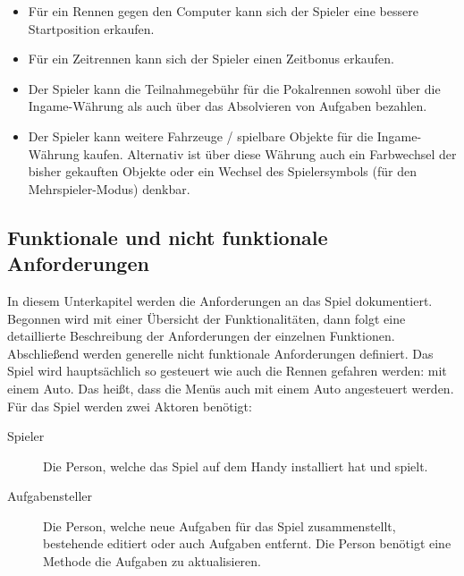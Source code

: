 \begin{enumerate}
		\begin{itemize}
			\item{Für ein Rennen gegen den Computer kann sich der Spieler eine bessere Startposition erkaufen.}
			\item{Für ein Zeitrennen kann sich der Spieler einen Zeitbonus erkaufen.}
			\item{Der Spieler kann die Teilnahmegebühr für die Pokalrennen sowohl über die Ingame-Währung als auch über das Absolvieren von Aufgaben bezahlen.}
			\item{Der Spieler kann weitere Fahrzeuge / spielbare Objekte für die Ingame-Währung kaufen. Alternativ ist über diese Währung auch ein Farbwechsel der bisher gekauften Objekte oder ein Wechsel des Spielersymbols (für den Mehrspieler-Modus) denkbar.}
		\end{itemize}
	\end{enumerate}

\subsection{Funktionale und nicht funktionale Anforderungen}\label{ssec:requirements}
	In diesem Unterkapitel werden die Anforderungen an das Spiel dokumentiert. Begonnen wird mit einer Übersicht der Funktionalitäten, dann folgt eine detaillierte Beschreibung der Anforderungen der einzelnen Funktionen. Abschließend werden generelle nicht funktionale Anforderungen definiert.
	Das Spiel wird hauptsächlich so gesteuert wie auch die Rennen gefahren werden: mit einem Auto. Das heißt, dass die Menüs auch mit einem Auto angesteuert werden.
	Für das Spiel werden zwei Aktoren benötigt:
	\begin{description}
		\item[Spieler]{ Die Person, welche das Spiel auf dem Handy installiert hat und spielt. }
		\item[Aufgabensteller]{ Die Person, welche neue Aufgaben für das Spiel zusammenstellt, bestehende editiert oder auch Aufgaben entfernt. Die Person benötigt eine Methode die Aufgaben zu aktualisieren. }
	\end{description}

